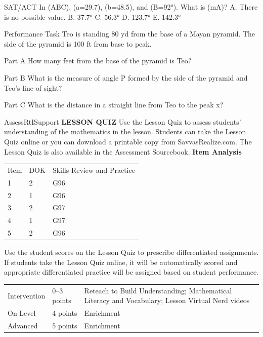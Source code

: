 \documentclass{article}
\newenvironment{practice}[2]{}{}        %
\newenvironment{te-addendum}[2]{}{}     %
\newcommand{\answer}[1]{}               %
\newcommand{\placeholder}[2]{}          %
\newcommand{\te}[1]{}                   %
\begin{document}
\begin{practice}{36}{1}
SAT/ACT In (\triangle ABC), (a=29.7), (b=48.5), and (B=92°). What is (m\angle A)?
A. There is no possible value.
B. 37.7°
C. 56.3°
D. 123.7°
E. 142.3°
\answer{B}
\end{practice}
\begin{practice}{37}{3}
Performance Task Teo is standing 80 yd from the base of a Mayan pyramid. The side of the pyramid is 100 ft from base to peak.
\placeholder{photo}{Mayan pyramid under cloudy blue sky. Black triangle overlays Teo lower left, pyramid base lower right, peak upper right. Horizontal base 80 yd, pyramid side 100 ft, sight line x; Teo angle 20°, peak angle P.}
Part A How many feet from the base of the pyramid is Teo?
\answer{Part A 240 ft}
Part B What is the measure of angle P formed by the side of the pyramid and Teo's line of sight?
\answer{Part B about 55.2°}
Part C What is the distance in a straight line from Teo to the peak x?
\answer{Part C about 282.6 ft}
\end{practice}
\begin{te-addendum}{Assess}{RtISupport}
\textbf{LESSON QUIZ}
Use the Lesson Quiz to assess students' understanding of the mathematics in the lesson.
Students can take the Lesson Quiz online or you can download a printable copy from SavvasRealize.com. The Lesson Quiz is also available in the Assessment Sourcebook.
\textbf{Item Analysis}
\begin{tabular}{lll}
Item & DOK & Skills Review and Practice \\
1 & 2 & G96 \\
2 & 1 & G96 \\
3 & 2 & G97 \\
4 & 1 & G97 \\
5 & 2 & G96 \\
\end{tabular}
Use the student scores on the Lesson Quiz to prescribe differentiated assignments.
If students take the Lesson Quiz online, it will be automatically scored and appropriate differentiated practice will be assigned based on student performance.
\begin{tabular}{lll}
Intervention & 0--3 points & Reteach to Build Understanding; Mathematical Literacy and Vocabulary; Lesson Virtual Nerd videos \\
On-Level & 4 points & Enrichment \\
Advanced & 5 points & Enrichment \\
\end{tabular}
\te{Assessment. Lesson Quiz is available at SavvasRealize.com.}
\end{te-addendum}
\end{document}
